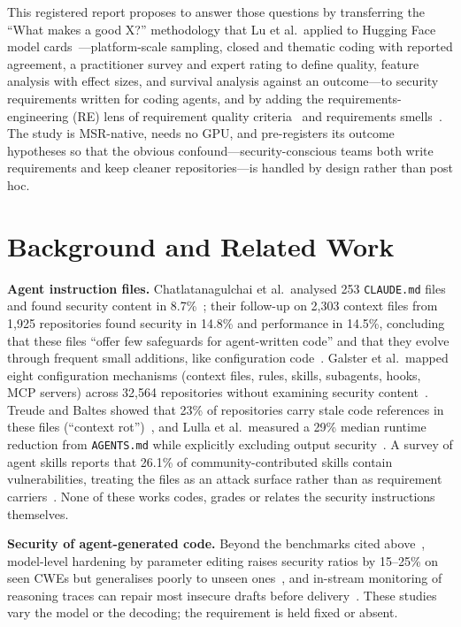 \documentclass[10pt,conference]{IEEEtran}
\begin{document}
This registered report proposes to answer those questions by transferring the ``What makes a good X?'' methodology that Lu et al.\ applied to Hugging Face model cards~\cite{lu2026modelcard}---platform-scale sampling, closed and thematic coding with reported agreement, a practitioner survey and expert rating to define quality, feature analysis with effect sizes, and survival analysis against an outcome---to security requirements written for coding agents, and by adding the requirements-engineering (RE) lens of requirement quality criteria~\cite{iso29148} and requirements smells~\cite{femmer2017smells}. The study is MSR-native, needs no GPU, and pre-registers its outcome hypotheses so that the obvious confound---security-conscious teams both write requirements and keep cleaner repositories---is handled by design rather than post hoc.

\section{Background and Related Work}

\textbf{Agent instruction files.} Chatlatanagulchai et al.\ analysed 253 \texttt{CLAUDE.md} files and found security content in 8.7\%~\cite{chatlatanagulchai2025manifests}; their follow-up on 2,303 context files from 1,925 repositories found security in 14.8\% and performance in 14.5\%, concluding that these files ``offer few safeguards for agent-written code'' and that they evolve through frequent small additions, like configuration code~\cite{chatlatanagulchai2026readmes}. Galster et al.\ mapped eight configuration mechanisms (context files, rules, skills, subagents, hooks, MCP servers) across 32,564 repositories without examining security content~\cite{galster2026configuring}. Treude and Baltes showed that 23\% of repositories carry stale code references in these files (``context rot'')~\cite{treude2026contextrot}, and Lulla et al.\ measured a 29\% median runtime reduction from \texttt{AGENTS.md} while explicitly excluding output security~\cite{lulla2026efficiency}. A survey of agent skills reports that 26.1\% of community-contributed skills contain vulnerabilities, treating the files as an attack surface rather than as requirement carriers~\cite{xu2026skills}. None of these works codes, grades or relates the security instructions themselves.

\textbf{Security of agent-generated code.} Beyond the benchmarks cited above~\cite{chen2026securevibebench,wu2026lastsecure}, model-level hardening by parameter editing raises security ratios by 15--25\% on seen CWEs but generalises poorly to unseen ones~\cite{sun2026safeedit}, and in-stream monitoring of reasoning traces can repair most insecure drafts before delivery~\cite{han2026secreason}. These studies vary the model or the decoding; the requirement is held fixed or absent.
\end{document}
